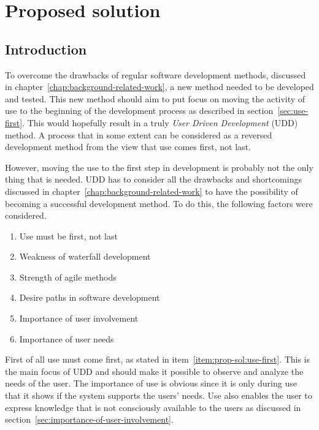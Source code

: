 \documentclass[a4paper]{report}
\begin{document}
\chapter{Proposed solution} \label{chap:proposed-solution}

\section{Introduction}
To overcome the drawbacks of regular software development methods, discussed in chapter~\ref{chap:background-related-work}, a new method needed to be developed and tested. This new method should aim to put focus on moving the activity of use to the beginning of the development process as described in section~\ref{sec:use-first}. This would hopefully result in a truly \emph{User Driven Development} (UDD) method. A process that in some extent can be considered as a reversed development method from the view that use comes first, not last.

However, moving the use to the first step in development is probably not the only thing that is needed. UDD has to consider all the drawbacks and shortcomings discussed in chapter~\ref{chap:background-related-work} to have the possibility of becoming a successful development method. To do this, the following factors were considered.

\begin{enumerate}
	\item Use must be first, not last			\label{item:prop-sol:use-first}
	\item Weakness of waterfall development		\label{item:prop-sol:waterfall}
	\item Strength of agile methods				\label{item:prop-sol:agile}
	\item Desire paths in software development	\label{item:prop-sol:desire-paths}
	\item Importance of user involvement		\label{item:prop-sol:user-involvement}
	\item Importance of user needs				\label{item:prop-sol:user-needs}
\end{enumerate}

First of all use must come first, as stated in item~\ref{item:prop-sol:use-first}. This is the main focus of UDD and should make it possible to observe and analyze the needs of the user. The importance of use is obvious since it is only during use that it shows if the system supports the users' needs. Use also enables the user to express knowledge that is not consciously available to the users as discussed in section~\ref{sec:importance-of-user-involvement}.
\end{document}
